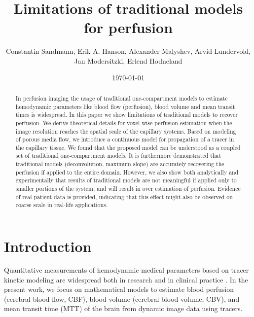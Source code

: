 \documentclass[journal,twocolumn]{IEEEtran}
\title{Limitations of traditional models for perfusion}
\author{Constantin Sandmann, Erik A. Hanson, Alexander Malyshev,  Arvid Lundervold, Jan Modersitzki, Erlend Hodneland }
\date{\today}
\begin{document}
	\maketitle

	\begin{abstract}
		In perfusion imaging the usage of traditional one-compartment models to estimate hemodynamic parameters like blood flow (perfusion), blood volume and mean transit times is widespread. In this paper we show limitations of traditional models to recover perfusion. We derive theoretical details for voxel wise perfusion estimation when the image resolution reaches the spatial scale of the capillary systems.  %
Based on modeling of porous media flow, we introduce a continuous model for propagation of a tracer in the capillary tissue. We found that the proposed model can be understood as a coupled set of traditional one-compartment models. It is furthermore demonstrated that traditional models (deconvolution, maximum slope) are accurately recovering the perfusion if applied to the entire domain. However, we also show both analytically and experimentally that results of traditional models are not meaningful if applied only to smaller portions of the system, and will result in over estimation of perfusion. Evidence of real patient data is provided, indicating that this effect might also be observed on coarse scale in real-life applications. 
	\end{abstract}

	\section{Introduction}
	
	Quantitative measurements of hemodynamic medical parameters based on tracer kinetic modeling are widespread both in research and in clinical practice \cite{sourbron13,Feng2013,Chen2011}. 
	In the present work, we focus on mathematical models to estimate blood perfusion (cerebral blood flow, CBF), blood volume (cerebral blood volume, CBV), and mean transit time (MTT) of the brain from dynamic image data using tracers. 
\end{document}
